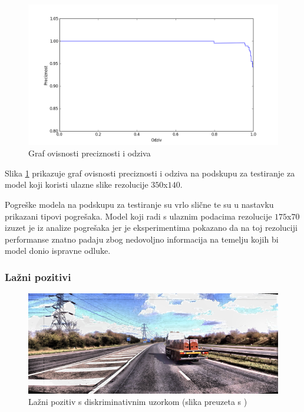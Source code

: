 \documentclass[times, utf8, diplomski, numeric]{fer}
\begin{document}
\begin{figure}[H]
\centering
\includegraphics[scale=0.55]{images/pr_350_140.png}
\caption{Graf ovisnosti preciznosti i odziva}
\label{img:pr_350_140}
\end{figure}
Slika \ref{img:pr_350_140} prikazuje graf ovisnosti preciznosti i odziva na podskupu za testiranje za model koji koristi ulazne slike rezolucije $350$x$140$.

Pogreške modela na podskupu za testiranje su vrlo slične te su u nastavku prikazani tipovi pogrešaka.
Model koji radi s ulaznim podacima rezolucije $175$x$70$ izuzet je iz analize pogrešaka jer je eksperimentima pokazano da na toj rezoluciji performanse znatno padaju zbog nedovoljno informacija na temelju kojih bi model donio ispravne odluke.

\subsubsection{Lažni pozitivi }

\begin{figure}[H]
\centering
\includegraphics[scale=0.5]{images/single_false_positive1.png}
\caption{Lažni pozitiv s diskriminativnim uzorkom (slika preuzeta s \citep{url:ftts_irap})}
\label{img:single_false_positive1}
\end{figure}
\end{document}
